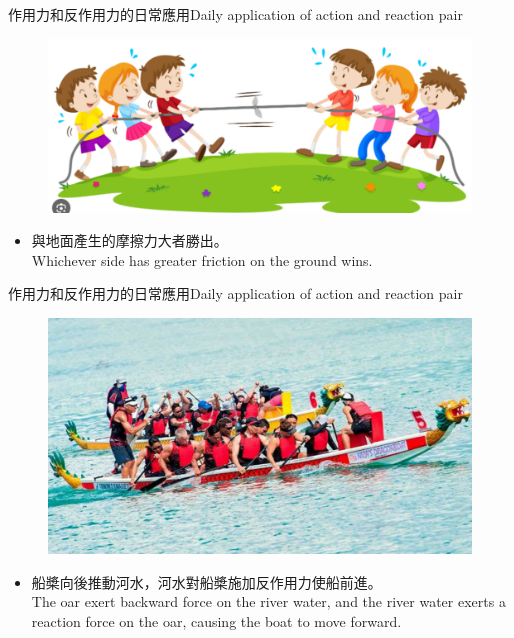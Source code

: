 \documentclass[beamer=true]{standalone}
\begin{document}
\begin{frame}{作用力和反作用力的日常應用Daily application of action and reaction pair}
    \begin{figure}[h!]
        \centering
        \includegraphics[width=.8\textwidth]{assets/ae0d3530.png}
    \end{figure}
    \begin{itemize}\bigskip
        \item 與地面產生的摩擦力大者勝出。\\Whichever side has greater friction on the ground wins.
    \end{itemize}
\end{frame}
\begin{frame}{作用力和反作用力的日常應用Daily application of action and reaction pair}
    \begin{figure}[h!]
        \centering
        \includegraphics[width=.75\textwidth]{assets/45e1912d.png}
    \end{figure}
    \begin{itemize}
        \item 船槳向後推動河水，河水對船槳施加反作用力使船前進。\\The oar exert backward force on the river water, and the river water exerts a reaction force on the oar, causing the boat to move forward.
    \end{itemize}
\end{frame}
\end{document}
